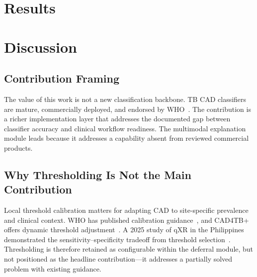 \documentclass[conference, letterpaper]{IEEEtran}
\begin{document}
\section{Results}


\section{Discussion}


\subsection{Contribution Framing}

The value of this work is not a new classification backbone. TB CAD classifiers are mature, commercially deployed, and endorsed by WHO~\cite{who_cad_approval_2025}. The contribution is a richer implementation layer that addresses the documented gap between classifier accuracy and clinical workflow readiness. The multimodal explanation module leads because it addresses a capability absent from reviewed commercial products.

\subsection{Why Thresholding Is Not the Main Contribution}

Local threshold calibration matters for adapting CAD to site-specific prevalence and clinical context. WHO has published calibration guidance~\cite{who_calibration}, and CAD4TB+ offers dynamic threshold adjustment~\cite{cad4tb_product}. A 2025 study of qXR in the Philippines demonstrated the sensitivity--specificity tradeoff from threshold selection~\cite{marquez2025philippines}. Thresholding is therefore retained as configurable within the deferral module, but not positioned as the headline contribution---it addresses a partially solved problem with existing guidance.
\end{document}
